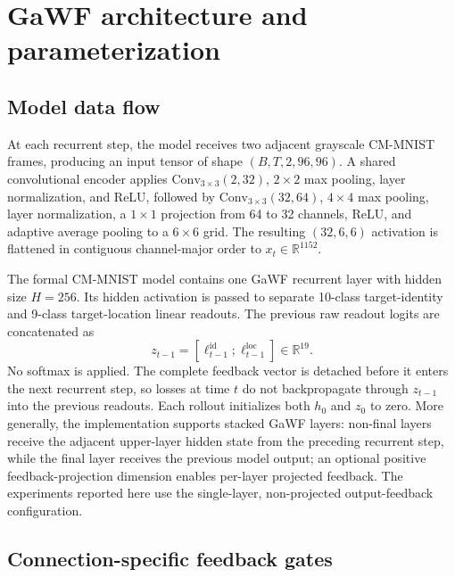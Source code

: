 \section{GaWF architecture and parameterization}
\label{app:gawf-architecture}

\subsection{Model data flow}

At each recurrent step, the model receives two adjacent grayscale CM-MNIST frames, producing an input tensor of shape \((B,T,2,96,96)\). A shared convolutional encoder applies \(\mathrm{Conv}_{3\times3}(2,32)\), \(2\times2\) max pooling, layer normalization, and ReLU, followed by \(\mathrm{Conv}_{3\times3}(32,64)\), \(4\times4\) max pooling, layer normalization, a \(1\times1\) projection from 64 to 32 channels, ReLU, and adaptive average pooling to a \(6\times6\) grid. The resulting \((32,6,6)\) activation is flattened in contiguous channel-major order to \(x_t\in\mathbb{R}^{1152}\).

The formal CM-MNIST model contains one GaWF recurrent layer with hidden size \(H=256\). Its hidden activation is passed to separate 10-class target-identity and 9-class target-location linear readouts. The previous raw readout logits are concatenated as
\[
z_{t-1}=[\ell^{\mathrm{id}}_{t-1};\ell^{\mathrm{loc}}_{t-1}]\in\mathbb{R}^{19}.
\]
No softmax is applied. The complete feedback vector is detached before it enters the next recurrent step, so losses at time \(t\) do not backpropagate through \(z_{t-1}\) into the previous readouts. Each rollout initializes both \(h_0\) and \(z_0\) to zero. More generally, the implementation supports stacked GaWF layers: non-final layers receive the adjacent upper-layer hidden state from the preceding recurrent step, while the final layer receives the previous model output; an optional positive feedback-projection dimension enables per-layer projected feedback. The experiments reported here use the single-layer, non-projected output-feedback configuration.

\subsection{Connection-specific feedback gates}

